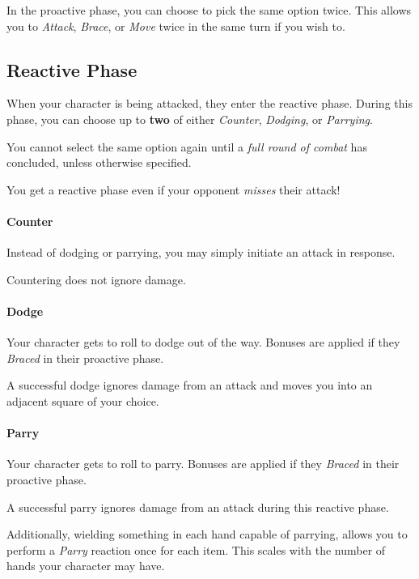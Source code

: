 \begin{note} 
  In the proactive phase, you can choose to pick the same option twice. 
  This allows you to \textit{Attack}, \textit{Brace}, or \textit{Move} twice in the same turn if you wish to.
\end{note}

\subsection{Reactive Phase}
When your character is being attacked, they enter the reactive phase.
During this phase, you can choose up to \textbf{two} of either \textit{Counter}, \textit{Dodging}, or \textit{Parrying}.

You cannot select the same option again until a \textit{full round of combat} has concluded, unless otherwise specified.

\begin{note}
  You get a reactive phase even if your opponent \textit{misses} their attack!
\end{note}

\paragraph{Counter}
Instead of dodging or parrying, you may simply initiate an attack in response.

Countering does not ignore damage.

\paragraph{Dodge}
Your character gets to roll to dodge out of the way.
Bonuses are applied if they \textit{Braced} in their proactive phase.

A successful dodge ignores damage from an attack and moves you into an adjacent square of your choice.

\paragraph{Parry}
Your character gets to roll to parry.
Bonuses are applied if they \textit{Braced} in their proactive phase.

A successful parry ignores damage from an attack during this reactive phase.

Additionally, wielding something in each hand capable of parrying, allows you to perform a \textit{Parry} reaction once for each item.
This scales with the number of hands your character may have.